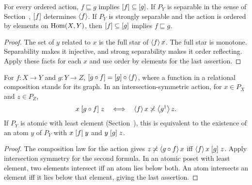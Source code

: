 \begin{prop}\label{prop-osa-relation}
For every ordered action, $f\sqsubseteq g$ implies
$\mathord{\mathrel{\left[f\right]}}\subseteq\mathord{\mathrel{\left[g\right]}}$. If $P_Y$ is separable
in the sense of Section~, $\mathrel{\left[f\right]}$
determines $\left\langle f\right\rangle$. If $P_Y$ is strongly separable and the action is
ordered by elements on $\operatorname{Hom}(X,Y)$, then
$\mathord{\mathrel{\left[f\right]}}\subseteq\mathord{\mathrel{\left[g\right]}}$ implies $f\sqsubseteq g$.
\end{prop}

\begin{proof}
The set of $y$ related to $x$ is the full star of $\left\langle f\right\rangle x$.
The full star is monotone. Separability makes it injective, and
strong separability makes it order reflecting. Apply these facts for
each $x$ and use order by elements for the last assertion.
\end{proof}

\begin{prop}\label{prop-osa-rel-comp}
For $f:X\to Y$ and $g:Y\to Z$,
$\mathord{\mathrel{\left[g\circ f\right]}}=\mathord{\mathrel{\left[g\right]}}\circ\left\langle f\right\rangle$,
where a function in a relational composition stands for its graph.
In an intersection-symmetric action, for $x\in P_X$ and $z\in P_Z$,
\[
 x\mathrel{\left[g\circ f\right]}z
 \quad\Longleftrightarrow\quad
 \left\langle f\right\rangle x\not\asymp\left\langle g^\dagger\right\rangle z.
\]
If $P_Y$ is atomic with least element (Section~),
this is equivalent to the
existence of an atom $y$ of $P_Y$ with $x\mathrel{\left[f\right]}y$ and $y\mathrel{\left[g\right]}z$.
\end{prop}

\begin{proof}
The composition law for the action gives
$z\not\asymp\left\langle g\circ f\right\rangle x$ iff $\left\langle f\right\rangle x\mathrel{\left[g\right]}z$.
Apply intersection symmetry for the second formula. In an atomic
poset with least element, two elements intersect iff an atom lies
below both. An atom intersects an element iff it lies below that
element, giving the last assertion.
\end{proof}

